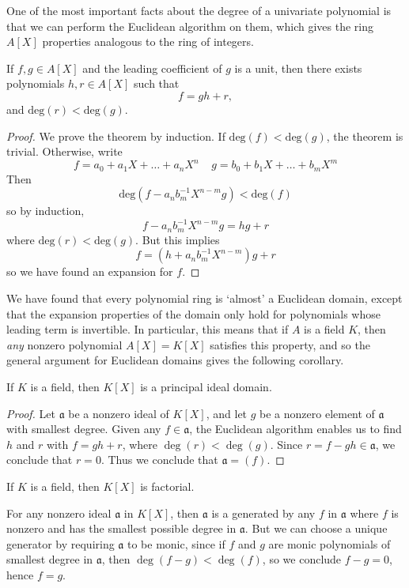 One of the most important facts about the degree of a univariate polynomial is that we can perform the Euclidean algorithm on them, which gives the ring $A[X]$ properties analogous to the ring of integers.

\begin{theorem}
    If $f,g \in A[X]$ and the leading coefficient of $g$ is a unit, then there exists polynomials $h,r \in A[X]$ such that
    \[ f = gh + r, \]
    and $\text{deg}(r) < \text{deg}(g)$.
\end{theorem}
\begin{proof}
    We prove the theorem by induction. If $\text{deg}(f) < \text{deg}(g)$, the theorem is trivial. Otherwise, write
    \[ f = a_0 + a_1 X + \dots + a_n X^n\ \ \ \ \ g = b_0 + b_1 X + \dots + b_m X^m \]
    Then
    \[ \text{deg}(f - a_n b_m^{-1} X^{n - m} g) < \text{deg}(f) \]
    so by induction,
    \[ f - a_n b_m^{-1} X^{n-m} g = hg + r \]
    where $\text{deg}(r) < \text{deg}(g)$. But this implies
    \[ f = (h + a_n b_m^{-1} X^{n-m}) g + r \]
    so we have found an expansion for $f$.
\end{proof}

We have found that every polynomial ring is `almost' a Euclidean domain, except that the expansion properties of the domain only hold for polynomials whose leading term is invertible. In particular, this means that if $A$ is a field $K$, then {\it any} nonzero polynomial $A[X] = K[X]$ satisfies this property, and so the general argument for Euclidean domains gives the following corollary.

\begin{corollary}
    If $K$ is a field, then $K[X]$ is a principal ideal domain.
\end{corollary}
\begin{proof}
    Let $\mathfrak{a}$ be a nonzero ideal of $K[X]$, and let $g$ be a nonzero element of $\mathfrak{a}$ with smallest degree. Given any $f \in \mathfrak{a}$, the Euclidean algorithm enables us to find $h$ and $r$ with $f = gh + r$, where $\deg(r) < \deg(g)$. Since $r = f - gh \in \mathfrak{a}$, we conclude that $r = 0$. Thus we conclude that $\mathfrak{a} = (f)$.
\end{proof}

\begin{corollary}
    If $K$ is a field, then $K[X]$ is factorial.
\end{corollary}

\begin{remark}
    For any nonzero ideal $\mathfrak{a}$ in $K[X]$, then $\mathfrak{a}$ is a generated by any $f$ in $\mathfrak{a}$ where $f$ is nonzero and has the smallest possible degree in $\mathfrak{a}$. But we can choose a unique generator by requiring $\mathfrak{a}$ to be monic, since if $f$ and $g$ are monic polynomials of smallest degree in $\mathfrak{a}$, then $\deg(f - g) < \deg(f)$, so we conclude $f - g = 0$, hence $f = g$.
\end{remark}

